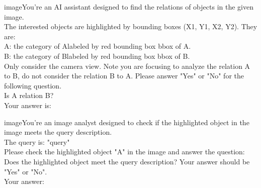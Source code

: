 \begin{prompt}[title={Prompt \thetcbcounter: Relation Recognizer VLM}] \label{prompt:relation}
\textlangle image\textrangle You're an AI assistant designed to find the relations of objects in the given image.\\

The interested objects are highlighted by bounding boxes (X1, Y1, X2, Y2). They are:\\

A: the \textlangle category of A\textrangle labeled by red bounding box \textlangle bbox of A\textrangle.\\
B: the \textlangle category of B\textrangle labeled by red bounding box \textlangle bbox of B\textrangle.\\

Only consider the camera view. Note you are focusing to analyze the relation A to B, do not consider the relation B to A. Please answer "Yes" or "No" for the following question.\\

Is A \textlangle relation\textrangle{} B?\\

Your answer is:
\end{prompt}


\begin{prompt}[title={Prompt \thetcbcounter: Answerer VLM}] \label{prompt:answerer}
\textlangle image\textrangle You're an image analyst designed to check if the highlighted object in the image meets the query description.\\

The query is: "\textlangle query\textrangle"\\

Please check the highlighted object "A" in the image and answer the question: Does the highlighted object meet the query description? Your answer should be "Yes" or "No".\\
    
Your answer:
\end{prompt}